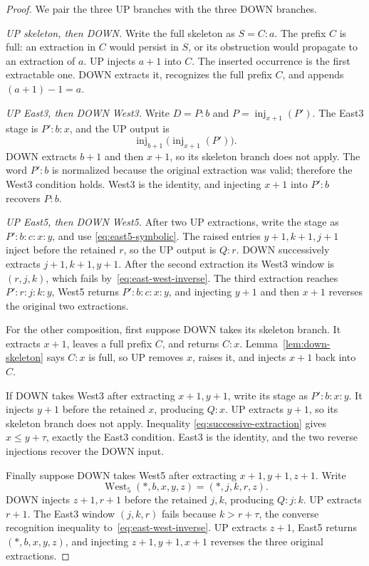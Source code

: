 \documentclass[11pt]{article}
\theoremstyle{definition}
\theoremstyle{remark}
\newcommand{\West}{\operatorname{West}}
\newcommand{\inj}{\operatorname{inj}}
\begin{document}
\begin{proof}
We pair the three UP branches with the three DOWN branches.

\smallskip
\noindent\emph{UP skeleton, then DOWN.}
Write the full skeleton as $S=C:a$.  The prefix $C$ is full: an extraction
in $C$ would persist in $S$, or its obstruction would propagate to an
extraction of $a$.  UP injects $a+1$ into $C$.  The inserted occurrence is
the first extractable one.  DOWN extracts it, recognizes the full prefix
$C$, and appends $(a+1)-1=a$.

\smallskip
\noindent\emph{UP East3, then DOWN West3.}
Write $D=P:b$ and $P=\inj_{x+1}(P')$.  The East3 stage is $P':b:x$, and the
UP output is
\[
  \inj_{b+1}\bigl(\inj_{x+1}(P')\bigr).
\]
DOWN extracts $b+1$ and then $x+1$, so its skeleton branch does not apply.
The word $P':b$ is normalized because the original extraction was valid;
therefore the West3 condition holds.  West3 is the identity, and injecting
$x+1$ into $P':b$ recovers $P:b$.

\smallskip
\noindent\emph{UP East5, then DOWN West5.}
After two UP extractions, write the stage as $P':b:c:x:y$, and use
\eqref{eq:east5-symbolic}.  The raised entries $y+1,k+1,j+1$ inject before
the retained $r$, so the UP output is $Q:r$.  DOWN successively extracts
$j+1,k+1,y+1$.  After the second extraction its West3 window is $(r,j,k)$,
which fails by~\eqref{eq:east-west-inverse}.  The third extraction reaches
$P':r:j:k:y$, West5 returns $P':b:c:x:y$, and injecting $y+1$ and then
$x+1$ reverses the original two extractions.

\smallskip
For the other composition, first suppose DOWN takes its skeleton branch.
It extracts $x+1$, leaves a full prefix $C$, and returns $C:x$.
Lemma~\ref{lem:down-skeleton} says $C:x$ is full, so UP removes $x$, raises
it, and injects $x+1$ back into $C$.

If DOWN takes West3 after extracting $x+1,y+1$, write its stage as
$P':b:x:y$.  It injects $y+1$ before the retained $x$, producing $Q:x$.
UP extracts $y+1$, so its skeleton branch does not apply.  Inequality
\eqref{eq:successive-extraction} gives $x\le y+\tau$, exactly the East3
condition.  East3 is the identity, and the two reverse injections recover
the DOWN input.

Finally suppose DOWN takes West5 after extracting $x+1,y+1,z+1$.  Write
\[
  \West_5(*,b,x,y,z)=(*,j,k,r,z).
\]
DOWN injects $z+1,r+1$ before the retained $j,k$, producing $Q:j:k$.
UP extracts $r+1$.  The East3 window $(j,k,r)$ fails because $k>r+\tau$,
the converse recognition inequality to~\eqref{eq:east-west-inverse}.  UP
extracts $z+1$, East5 returns $(*,b,x,y,z)$, and injecting
$z+1,y+1,x+1$ reverses the three original extractions.
\end{proof}
\end{document}
